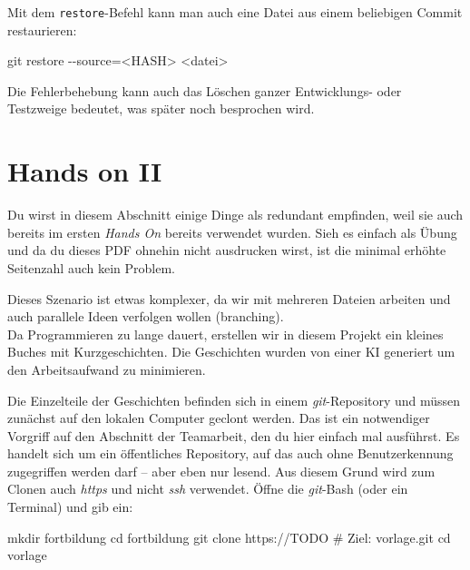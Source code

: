 \documentclass[
  letterpaper,
  DIV=11]{scrreprt}
\newenvironment{Shaded}{\begin{snugshade}}{\end{snugshade}}
\newcommand{\AttributeTok}[1]{\textcolor[rgb]{0.40,0.45,0.13}{#1}}
\newcommand{\BuiltInTok}[1]{\textcolor[rgb]{0.00,0.23,0.31}{#1}}
\newcommand{\CommentTok}[1]{\textcolor[rgb]{0.37,0.37,0.37}{#1}}
\newcommand{\FunctionTok}[1]{\textcolor[rgb]{0.28,0.35,0.67}{#1}}
\newcommand{\NormalTok}[1]{\textcolor[rgb]{0.00,0.23,0.31}{#1}}
\newcommand{\OperatorTok}[1]{\textcolor[rgb]{0.37,0.37,0.37}{#1}}
\newcommand{\git}{\textit{git}\xspace}
\begin{document}
Mit dem \texttt{restore}-Befehl kann man auch eine Datei aus einem
beliebigen Commit restaurieren:

\begin{Shaded}
\begin{Highlighting}[]
\FunctionTok{git}\NormalTok{ restore }\AttributeTok{{-}{-}source}\OperatorTok{=\textless{}}\NormalTok{HASH}\OperatorTok{\textgreater{}} \OperatorTok{\textless{}}\NormalTok{datei}\OperatorTok{\textgreater{}}
\end{Highlighting}
\end{Shaded}

Die Fehlerbehebung kann auch das Löschen ganzer Entwicklungs- oder
Testzweige bedeutet, was später noch besprochen wird.


\chapter{Hands on II}\label{hands-on-ii}

Du wirst in diesem Abschnitt einige Dinge als redundant empfinden, weil
sie auch bereits im ersten \emph{Hands On} bereits verwendet wurden.
Sieh es einfach als Übung und da du dieses PDF ohnehin nicht ausdrucken
wirst, ist die minimal erhöhte Seitenzahl auch kein Problem.

Dieses Szenario ist etwas komplexer, da wir mit mehreren Dateien
arbeiten und auch parallele Ideen verfolgen wollen (branching).\\
Da Programmieren zu lange dauert, erstellen wir in diesem Projekt ein
kleines Buches mit Kurzgeschichten. Die Geschichten wurden von einer KI
generiert um den Arbeitsaufwand zu minimieren.

Die Einzelteile der Geschichten befinden sich in einem \git-Repository
und müssen zunächst auf den lokalen Computer geclont werden. Das ist ein
notwendiger Vorgriff auf den Abschnitt der Teamarbeit, den du hier
einfach mal ausführst. Es handelt sich um ein öffentliches Repository,
auf das auch ohne Benutzerkennung zugegriffen werden darf -- aber eben
nur lesend. Aus diesem Grund wird zum Clonen auch \emph{https} und nicht
\emph{ssh} verwendet. Öffne die \git-Bash (oder ein Terminal) und gib
ein:

\begin{Shaded}
\begin{Highlighting}[]
\FunctionTok{mkdir}\NormalTok{ fortbildung}
\BuiltInTok{cd}\NormalTok{ fortbildung}
\FunctionTok{git}\NormalTok{ clone https://TODO }\CommentTok{\# Ziel: vorlage.git }
\BuiltInTok{cd}\NormalTok{ vorlage}
\end{Highlighting}
\end{Shaded}
\end{document}
